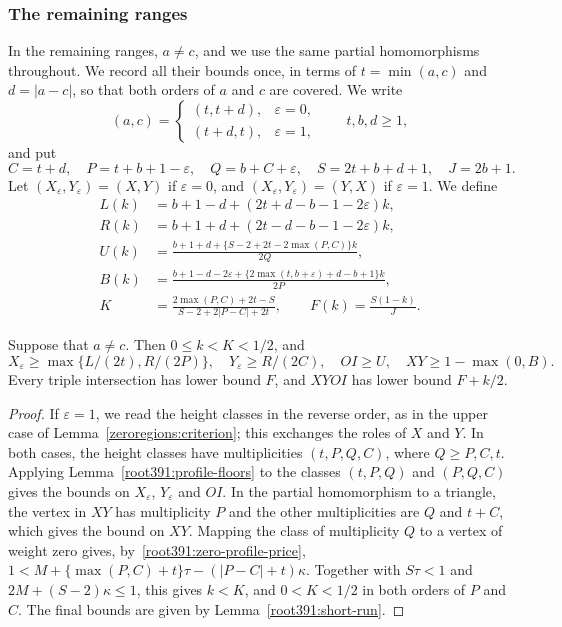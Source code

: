 \subsubsection{The remaining ranges}
In the remaining ranges, $a\ne c$, and we use the same partial homomorphisms throughout. We record
all their bounds once, in terms of $t=\min(a,c)$ and $d=|a-c|$, so that both orders of $a$ and $c$ are covered. We write
\[
 (a,c)=\begin{cases}(t,t+d),&\varepsilon=0,\\
 (t+d,t),&\varepsilon=1,\end{cases}
 \qquad t,b,d\ge1,
\]
and put
\[
 C=t+d,\quad P=t+b+1-\varepsilon,\quad Q=b+C+\varepsilon,
 \quad S=2t+b+d+1,\quad J=2b+1.
\]
Let $(X_\varepsilon,Y_\varepsilon)=(X,Y)$ if $\varepsilon=0$,
and $(X_\varepsilon,Y_\varepsilon)=(Y,X)$ if $\varepsilon=1$. We define
\[
\begin{split}
 L(k)&=b+1-d+(2t+d-b-1-2\varepsilon)k,\\
 R(k)&=b+1+d+(2t-d-b-1-2\varepsilon)k,\\
 U(k)&=\frac{b+1+d+\{S-2+2t-2\max(P,C)\}k}{2Q},\\
 B(k)&=\frac{b+1-d-2\varepsilon+
 \{2\max(t,b+\varepsilon)+d-b+1\}k}{2P},\\
 K&=\frac{2\max(P,C)+2t-S}{S-2+2|P-C|+2t},
 \qquad F(k)=\frac{S(1-k)}J.
\end{split}
\]
\begin{lemma}
\label{internal:common-count-bounds}
Suppose that $a\ne c$. Then $0\le k<K<1/2$, and
\[
 X_\varepsilon\ge\max\{L/(2t),R/(2P)\},\quad
 Y_\varepsilon\ge R/(2C),\quad OI\ge U,\quad
 XY\ge1-\max(0,B).
\]
Every triple intersection has lower bound $F$, and $XYOI$
has lower bound $F+k/2$.
\end{lemma}
\begin{proof}
If $\varepsilon=1$, we read the height classes in the reverse order, as in the upper case of Lemma~\ref{zeroregions:criterion}; this exchanges the roles of $X$ and $Y$. In both cases, the height classes have multiplicities
$(t,P,Q,C)$, where $Q\ge P,C,t$. Applying
Lemma~\ref{root391:profile-floors} to the classes $(t,P,Q)$ and $(P,Q,C)$
gives the bounds on $X_\varepsilon$, $Y_\varepsilon$ and $OI$.
In the partial homomorphism to a triangle, the vertex in $XY$ has multiplicity
$P$ and the other multiplicities are $Q$ and $t+C$, which gives the bound on $XY$.
Mapping the class of multiplicity $Q$ to a vertex of weight zero gives, by~\eqref{root391:zero-profile-price}, $1<M+\{\max(P,C)+t\}\tau-(|P-C|+t)\kappa$. Together with $S\tau<1$ and $2M+(S-2)\kappa\le1$, this gives
$k<K$, and $0<K<1/2$ in both orders of
$P$ and $C$. The final bounds are given by Lemma~\ref{root391:short-run}.
\end{proof}

